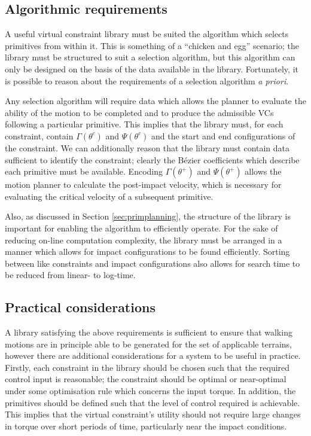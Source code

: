 \subsection{Algorithmic requirements} \label{sec:algreqs}
A useful virtual constraint library must be suited the algorithm which selects primitives from within it. This is something of a ``chicken and egg'' scenario; the library must be structured to suit a selection algorithm, but this algorithm can only be designed on the basis of the data available in the library. Fortunately, it is possible to reason about the requirements of a selection algorithm \textit{a priori}.

Any selection algorithm will require data which allows the planner to evaluate the ability of the motion to be completed and to produce the admissible VCs following a particular primitive. This implies that the library must, for each constraint, contain $\Gamma(\theta^c)$ and $\Psi(\theta^c)$ and the start and end configurations of the constraint. We can additionally reason that the library must contain data sufficient to identify the constraint; clearly the Bézier coefficients which describe each primitive must be available. Encoding $\Gamma(\theta^+)$ and $\Psi(\theta^+)$ allows the motion planner to calculate the post-impact velocity, which is necessary for evaluating the critical velocity of a subsequent primitive.

Also, as discussed in Section \ref{sec:primplanning}, the structure of the library is important for enabling the algorithm to efficiently operate. For the sake of reducing on-line computation complexity, the library must be arranged in a manner which allows for impact configurations to be found efficiently. Sorting between like constraints and impact configurations also allows for search time to be reduced from linear- to log-time.

\subsection{Practical considerations}
A library satisfying the above requirements is sufficient to ensure that walking motions are in principle able to be generated for the set of applicable terrains, however there are additional considerations for a system to be useful in practice. Firstly, each constraint in the library should be chosen such that the required control input is reasonable; the constraint should be optimal or near-optimal under some optimisation rule which concerns the input torque. In addition, the primitives should be defined such that the level of control required is achievable. This implies that the virtual constraint's utility should not require large changes in torque over short periods of time, particularly near the impact conditions.

